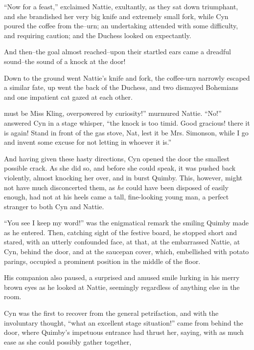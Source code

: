 ``Now for a feast,'' exclaimed Nattie, exultantly, as they sat down
triumphant, and she brandished her very big knife and extremely small
fork, while Cyn poured the coffee from the--urn; an undertaking attended
with some difficulty, and requiring caution; and the Duchess looked on
expectantly.

And then--the goal almost reached--upon their startled ears came a
dreadful sound--the sound of a knock at the door!

Down to the ground went Nattie's knife and fork, the coffee-urn narrowly
escaped a similar fate, up went the back of the Duchess, and two
dismayed Bohemians and one impatient cat gazed at each other.








 must be Miss Kling, overpowered by curiosity!'' murmured Nattie.\Fparn%
``No!'' answered Cyn in a stage whisper, ``the knock is too timid. Good
gracious! there it is again! Stand in front of the gas stove, Nat, lest
it be Mrs. Simonson, while I go and invent some excuse for not letting
in whoever it is.''

And having given these hasty directions, Cyn opened the door the
smallest possible crack. As she did so, and before she could speak, it
was pushed back violently, almost knocking her over, and in burst
Quimby. This, however, might not have much disconcerted them, as \emph{he}
could have been disposed of easily enough, had not at his heels came a
tall, fine-looking young man, a perfect stranger to both Cyn and Nattie.

``You see I keep my word!'' was the enigmatical remark the smiling Quimby
made as he entered. Then, catching sight of the festive board, he
stopped short and stared, with an utterly confounded face, at that, at
the embarrassed Nattie, at Cyn, behind the door, and at the saucepan
cover, which, embellished with potato parings, occupied a prominent
position in the middle of the floor.

His companion also paused, a surprised and amused smile lurking in his
merry brown eyes as he looked at Nattie, seemingly regardless of
anything else in the room.

Cyn was the first to recover from the general petrifaction, and with the
involuntary thought, ``what an excellent stage situation!'' came from
behind the door, where Quimby's impetuous entrance had thrust her,
saying, with as much ease as she could possibly gather together,

